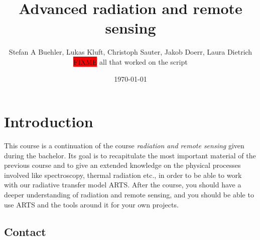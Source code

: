 
\usepackage{mathtools}
\usepackage{amssymb}  %
\usepackage{euler}  %
\renewcommand{\epsilon}{\varepsilon}  %

\usepackage{graphicx}  %
\usepackage{float}  %
\usepackage{floatflt}  %
\usepackage{subcaption}  %

\usepackage{enumerate}
\usepackage{textcomp}  %

\usepackage{framed}

\usepackage{chemfig}

\title{Advanced radiation and remote sensing}
\author{Stefan A Buehler, Lukas Kluft, Christoph Sauter, Jakob Doerr, Laura Dietrich  \colorbox{red}{FIXME} all that worked on
the script}
\date{\today}


\maketitle
\thispagestyle{empty}\pagestyle{empty}
\newpage
\tableofcontents
\newpage\pagestyle{fancy}



\section{Introduction}

This course is a continuation of the course \textit{radiation and
  remote sensing} given during the bachelor. Its goal is to
recapitulate the most important material of the previous course and to
give an extended knowledge on the physical processes involved like
spectroscopy, thermal radiation etc., in order to be able to work with
our radiative transfer model ARTS. After the course, you should have a
deeper understanding of radiation and remote sensing, and you should be
able to use ARTS and the tools around it for your own projects.

\subsection*{Contact}

